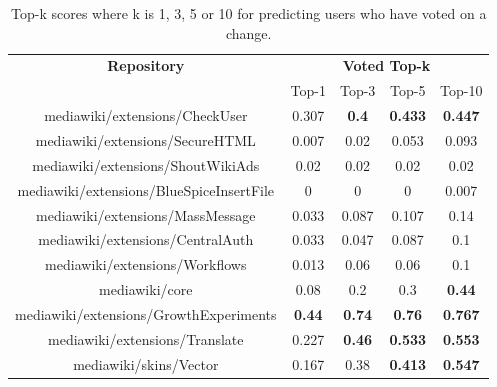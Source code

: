 \begin{table}[H]
\begin{center}
\begin{tabular}{@{}c c c c c@{}} 
\hline
    \textbf{Repository} &
    \multicolumn{4}{c}{\textbf{Voted Top-k}} \\
      & {Top-1} & {Top-3} & {Top-5} & {Top-10} \\
      \hline
mediawiki/extensions/CheckUser & 0.307 & \textbf{0.4} & \textbf{0.433} & \textbf{0.447} \\
mediawiki/extensions/SecureHTML & 0.007 & 0.02 & 0.053 & 0.093 \\
mediawiki/extensions/ShoutWikiAds & 0.02 & 0.02 & 0.02 & 0.02 \\
mediawiki/extensions/BlueSpiceInsertFile & 0 & 0 & 0 & 0.007 \\
mediawiki/extensions/MassMessage & 0.033 & 0.087 & 0.107 & 0.14 \\
mediawiki/extensions/CentralAuth & 0.033 & 0.047 & 0.087 & 0.1 \\
mediawiki/extensions/Workflows & 0.013 & 0.06 & 0.06 & 0.1 \\
mediawiki/core & 0.08 & 0.2 & 0.3 & \textbf{0.44} \\
mediawiki/extensions/GrowthExperiments & \textbf{0.44} & \textbf{0.74} & \textbf{0.76} & \textbf{0.767} \\
mediawiki/extensions/Translate & 0.227 & \textbf{0.46} & \textbf{0.533} & \textbf{0.553} \\
mediawiki/skins/Vector & 0.167 & 0.38 & \textbf{0.413} & \textbf{0.547} \\
\hline
\end{tabular}
\end{center}
\caption{\label{table:top-k-voted}Top-k scores where k is 1, 3, 5 or 10 for predicting users who have voted on a change.}
\end{table}

